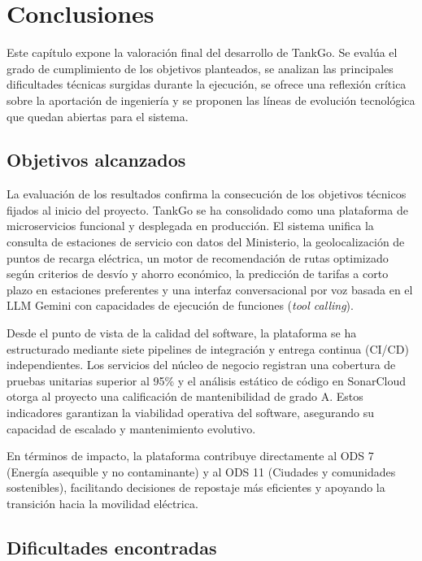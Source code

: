 \chapter{Conclusiones}
\label{ch:conclusiones}
Este capítulo expone la valoración final del desarrollo de TankGo. Se evalúa el grado de cumplimiento de los objetivos planteados,
se analizan las principales dificultades técnicas surgidas durante la ejecución, se ofrece una reflexión crítica sobre la aportación
de ingeniería y se proponen las líneas de evolución tecnológica que quedan abiertas para el sistema.

\section{Objetivos alcanzados}
\label{sec:objetivos-alcanzados}
La evaluación de los resultados confirma la consecución de los objetivos técnicos fijados al inicio del proyecto.
TankGo se ha consolidado como una plataforma de microservicios funcional y desplegada en producción.
El sistema unifica la consulta de estaciones de servicio con datos del Ministerio, la geolocalización de puntos de recarga eléctrica,
un motor de recomendación de rutas optimizado según criterios de desvío y ahorro económico, la predicción de tarifas a corto plazo en
estaciones preferentes y una interfaz conversacional por voz basada en el LLM Gemini con capacidades de ejecución de funciones (\textit{tool calling}).

Desde el punto de vista de la calidad del software, la plataforma se ha estructurado mediante siete pipelines de integración y entrega continua (CI/CD) independientes.
Los servicios del núcleo de negocio registran una cobertura de pruebas unitarias superior al 95\% y el análisis estático de código en SonarCloud otorga al proyecto
una calificación de mantenibilidad de grado A. Estos indicadores garantizan la viabilidad operativa del software, asegurando su capacidad de escalado y mantenimiento evolutivo.

En términos de impacto, la plataforma contribuye directamente al ODS 7 
(Energía asequible y no contaminante) y al ODS 11 (Ciudades y comunidades 
sostenibles), facilitando decisiones de repostaje más eficientes y apoyando 
la transición hacia la movilidad eléctrica.

\section{Dificultades encontradas}
\label{sec:dificultades}

